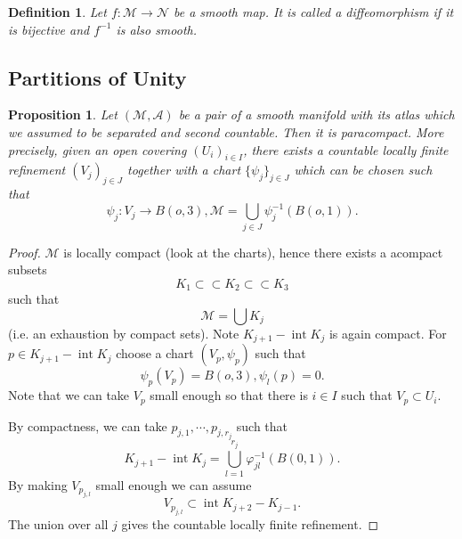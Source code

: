 \documentclass[8pt]{article}
\newtheorem{proposition}{Proposition}[section]
\newtheorem{definition}{Definition}[section]
\DeclareMathOperator{\interior}{int}
\newcommand{\compinc}[0]{\subset \subset}
\begin{document}
\begin{definition}
  Let $f:\mathcal{M}\to\mathcal{N}$ be a smooth map. It is called a diffeomorphism if it is bijective and $f^{-1}$ is also smooth.
\end{definition}
\subsection{Partitions of Unity}

\begin{proposition}
  Let $(\mathcal{M},\mathcal{A})$ be a pair of a smooth manifold with its atlas which we assumed to be separated and second countable. Then it is paracompact. More precisely, given an open covering $(U_i)_{i\in I}$, there exists a countable locally finite refinement $(V_j)_{j\in J}$ together with a chart $\{\psi_j\}_{j\in J}$ which can be chosen such that 
  \begin{equation*}
    \psi_j:V_j\to B(o,3),\mathcal{M} = \bigcup_{j\in J}\psi_j^{-1}(B(o,1)).
  \end{equation*}
  \label{smooth_manifold_paracompact}
\end{proposition}

\begin{proof}
$\mathcal{M}$ is locally compact (look at the charts), hence there exists a acompact subsets
\begin{equation*}
  K_1\compinc K_2\compinc K_3
\end{equation*}
such that 
\begin{equation*}
  \mathcal{M} = \bigcup K_j
\end{equation*}
(i.e. an exhaustion by compact sets). Note $K_{j+1}-\interior K_j$ is again compact. For $p\in K_{j+1}-\interior K_j$ choose a chart $(V_p,\psi_p)$ such that 
\begin{equation*}
  \psi_p(V_p) = B(o,3), \psi_l(p) = 0.
\end{equation*}
Note that we can take $V_p$ small enough so that there is $i\in I$ such that $V_p\subset U_i$. 
\par By compactness, we can take $p_{j,1},\cdots,p_{j,r_j}$ such that 
\begin{equation*}
  K_{j+1}-\interior K_j = \bigcup_{l=1}^{r_j} \varphi_{jl}^{-1}(B(0,1)).
\end{equation*}
By making $V_{p_{j,l}}$ small enough we can assume 
\begin{equation*}
  V_{p_{j,l}}\subset\interior K_{j+2}-K_{j-1}.
\end{equation*}
The union over all $j$ gives the countable locally finite refinement.
\end{proof}
\end{document}
